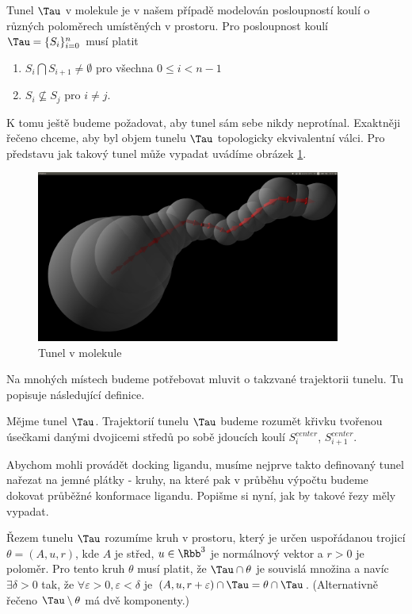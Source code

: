 Tunel $ \Tau $ v molekule je v našem případě modelován posloupností koulí o různých
poloměrech umístěných v prostoru. Pro posloupnost koulí $ \Tau = \{S_i\}_{i=0}^{n} $
musí platit

    \begin{enumerate}[label={(\arabic*)}]
        \item $ S_i \bigcap S_{i+1} \neq \emptyset $ pro všechna $ 0 \leq i < n - 1$
        \item $ S_i \nsubseteq S_j$  pro $ i \neq j $.
    \end{enumerate}

K tomu ještě budeme požadovat, aby tunel sám sebe nikdy neprotínal. Exaktněji řečeno
chceme, aby byl objem tunelu $ \Tau $ topologicky ekvivalentní válci.
Pro představu jak takový tunel může vypadat uvádíme obrázek \ref{fig:basic_tunnel}.
\begin{figure}[ht]
  	\centering
	\includegraphics[width=100mm]{img/basic_tunnel.jpg}
	\caption{Tunel v molekule}
  \centering
  \label{fig:basic_tunnel}
\end{figure}

Na mnohých místech budeme potřebovat mluvit o takzvané trajektorii tunelu. Tu popisuje
následující definice.

\begin{defi}
Mějme tunel $ \Tau $. Trajektorií tunelu $ \Tau $ budeme rozumět křivku tvořenou
úsečkami danými dvojicemi středů po sobě jdoucích koulí $ S_i^{center} $,
$ S_{i+1}^{center} $.
\end{defi}

Abychom mohli provádět docking ligandu, musíme nejprve takto definovaný tunel nařezat na
jemné plátky - kruhy, na které pak v průběhu výpočtu budeme dokovat průběžné konformace ligandu.
Popišme si nyní, jak by takové řezy měly vypadat.

\begin{defi}
Řezem tunelu $ \Tau $ rozumíme kruh v prostoru, který je určen uspořádanou trojicí
$\theta = (A, u, r)$, kde $ A $ je střed, $ u \in \Rbb^3 $ je normálnový vektor a $ r > 0 $ je poloměr.
Pro tento kruh $ \theta $ musí platit, že $ \Tau \cap \theta $ je souvislá množina a navíc
$ \exists \delta > 0 $ tak, že $ \forall \varepsilon > 0,  \varepsilon < \delta $ je
$ (A, u, r + \varepsilon) \cap \Tau = \theta \cap \Tau $.
(Alternativně řečeno $\Tau \setminus \theta $ má dvě komponenty.)
\end{defi}


